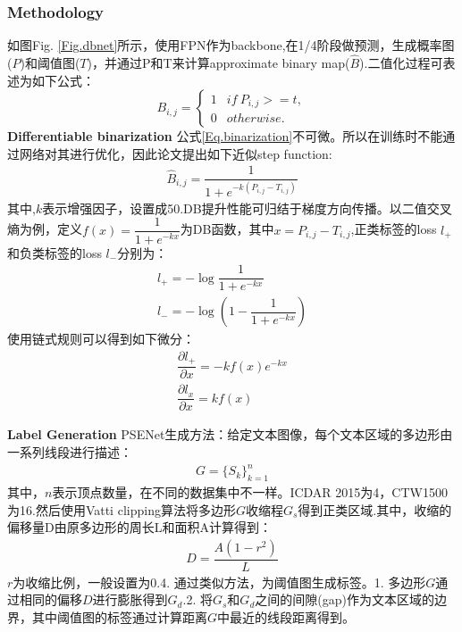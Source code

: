 \documentclass{article}
\begin{document}
\subsubsection{Methodology}
如图Fig. \ref{Fig.dbnet}所示，使用FPN作为backbone,在1/4阶段做预测，生成概率图($P$)和阈值图($T$)，并通过P和T来计算approximate binary map($\hat{B}$).二值化过程可表述为如下公式：
\begin{equation}
B_{i,j} = \left\{
\begin{array}{lr}
1 & if \: P_{i,j} >=t, \\
0 & otherwise.
\end{array}
\right.
\label{Eq.binarization}
\end{equation}
\textbf{Differentiable binarization} 公式\ref{Eq.binarization}不可微。所以在训练时不能通过网络对其进行优化，因此论文提出如下近似step function:
\begin{align}
\hat{B}_{i,j}=\dfrac{1}{1+e^{-k(P_{i,j}-T_{i,j})}}
\end{align}
其中,$k$表示增强因子，设置成50.DB提升性能可归结于梯度方向传播。以二值交叉熵为例，定义$f(x)=\dfrac{1}{1+e^{-kx}}$为DB函数，其中$x=P_{i,j}-T_{i,j}$,正类标签的loss $l_+$和负类标签的loss $l_-$分别为：
\begin{equation}
\begin{aligned}
l_+ = -\log{\dfrac{1}{1+e^{-kx}}} \\
l_- = -\log{(1-\dfrac{1}{1+e^{-kx}})}
\end{aligned}
\end{equation}
使用链式规则可以得到如下微分：
\begin{align}
\dfrac{\partial l_+}{\partial x} = -kf(x)e^{-kx} \\
\dfrac{\partial l_x}{\partial x} = kf(x)
\end{align}

\textbf{Label Generation}
PSENet生成方法：给定文本图像，每个文本区域的多边形由一系列线段进行描述：
\begin{align}
G = \{ S_k \}_{k=1}^n
\end{align}
其中，$n$表示顶点数量，在不同的数据集中不一样。ICDAR 2015为4，CTW1500为16.然后使用Vatti clipping算法将多边形$G$收缩程$G_s$得到正类区域.其中，收缩的偏移量D由原多边形的周长L和面积A计算得到：
\begin{align}
D=\dfrac{A(1-r^2)}{L}
\end{align}
$r$为收缩比例，一般设置为0.4. 通过类似方法，为阈值图生成标签。1. 多边形$G$通过相同的偏移$D$进行膨胀得到$G_d$.2. 将$G_s$和$G_d$之间的间隙(gap)作为文本区域的边界，其中阈值图的标签通过计算距离$G$中最近的线段距离得到。
\end{document}
